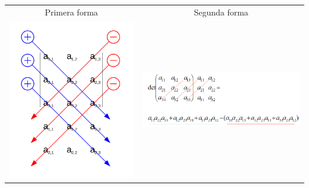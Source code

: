 \documentclass[stu, 12pt, letterpaper, donotrepeattitle, floatsintext, natbib]{apa7}
\begin{document}
\begin{table}
\begin{tabular}{cc}

Primera forma & Segunda forma \\
\includegraphics[scale=0.25]{sarrus}
&
\includegraphics[scale=0.5]{sarrus2}

\end{tabular}
\end{table}
\end{document}

